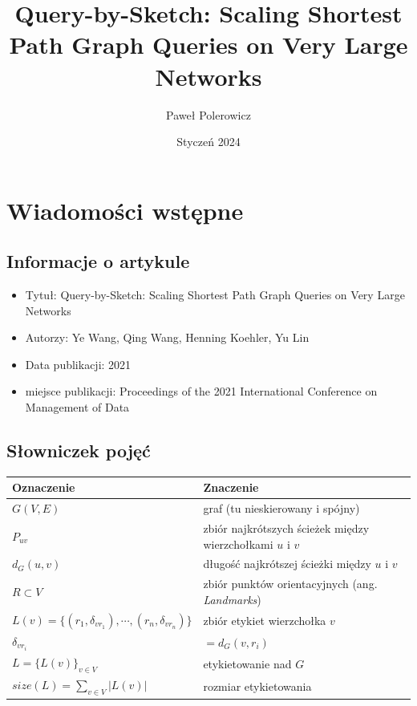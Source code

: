 \documentclass{article}
\title{\textbf{Query-by-Sketch: Scaling Shortest Path Graph Queries on Very Large Networks}}
\author{Paweł Polerowicz}
\date{Styczeń 2024}
\theoremstyle{definition}
\begin{document}
    \maketitle
    \section{Wiadomości wstępne}
    
    \subsection{Informacje o artykule}
    \begin{itemize}
        \item Tytuł: Query-by-Sketch: Scaling Shortest Path Graph Queries on Very Large Networks
        \item Autorzy: Ye Wang, Qing Wang, Henning Koehler, Yu Lin
        \item Data publikacji: 2021
        \item miejsce publikacji: Proceedings of the 2021 International Conference on Management of Data
    \end{itemize}
    
    \subsection{Słowniczek pojęć}

    \begin{tabular}{|l | l | } 
        \hline
        Oznaczenie & Znaczenie \\
        \hline\hline
        $G(V,E)$ & graf (tu nieskierowany i spójny) \\ 
        \hline
        $P_{uv}$ & zbiór najkrótszych ścieżek między wierzchołkami $u$ i $v$ \\ 
        \hline
        $d_G(u, v)$ & długość najkrótszej ścieżki między $u$ i $v$ \\ 
        \hline
        $R \subset V$ & zbiór punktów orientacyjnych (ang. \textit{Landmarks}) \\ 
        \hline
        $L(v) = \{(r_1, \delta_{vr_1}),\cdots,(r_n, \delta_{vr_n})\}$ & zbiór etykiet wierzchołka $v$ \\ 
        \hline
        $\delta_{vr_i}$ & $= d_G(v, r_i)$ \\ 
        \hline
        $L = \{L(v)\}_{v \in V}$ & etykietowanie nad $G$\\ 
        \hline
        $size(L) = \sum_{v \in V}|L(v)|$ & rozmiar etykietowania \\ 
        \hline
    \end{tabular}\\
    
\end{document}
